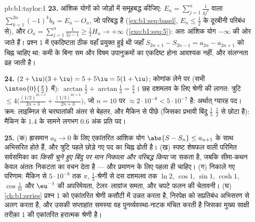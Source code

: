 \begin{solution}{pb:b1:taylor:1}
\textbf{23.} आंशिक योगों को जोड़ों में समूहबद्ध कीजिए: $E_n = \sum_{j=1}^{n}
\frac{1}{4j^2}$ वाला $\sum_{k=1}^{2n} (-1)^k b_k = E_n - O_n$, जो परिबद्ध है
(\cref{ex:b1:seq:basel}, $E_n \leq \frac12$ के दूरबीनी परिबंध से), और $O_n =
\sum_{j=1}^{n}\frac{1}{2j-1} \geq \frac12 H_n \to +\infty$
(\cref{exo:b1:seq:5}): अतः आंशिक योग $-\infty$ की ओर जाते हैं। प्रश्न 1 में
एकदिष्टता ठीक वहाँ प्रयुक्त हुई थी जहाँ $S_{2n+1} - S_{2n-1} = a_{2n} -
a_{2n+1}$ को चिह्न चाहिए था: कमी के बिना सम और विषम उपानुक्रमों का एकदिष्ट
होना आवश्यक नहीं, और संलग्नता ढह जाती है।

\textbf{24.} $(2+\iu)(3+\iu) = 5 + 5\iu = 5(1+\iu)$; कोणांक लेने पर (सभी
$\intoo{0}{\frac\pi2}$ में): $\arctan\frac12 + \arctan\frac13 = \frac\pi4$।
छह दशमलव के लिए श्रेणी की लागत: त्रुटि $\leq
4\bigl(\frac{(1/2)^{2n+3}}{2n+3} + \frac{(1/3)^{2n+3}}{2n+3}\bigr)$, जो $n =
10$ पर $\approx 2\cdot10^{-8} < 5\cdot10^{-7}$ है: अर्थात् ग्यारह पद। क्रम:
लाइब्निज़ से चरघातांकी अंतर से बेहतर, और मैकिन से पीछे (जिसका प्रभावी बिंदु
$\frac15$ $\frac12$ से छोटा है): मैकिन के $1.4$ के सामने लगभग $0.6$ अंक
प्रति पद।

\textbf{25.} (क) ह्रासमान $a_k \to 0$ के लिए एकांतरित आंशिक योग $\abs{S -
S_n} \leq a_{n+1}$ के साथ अभिसरित होते हैं, और त्रुटि पहले छोड़े गए पद का
चिह्न ढोती है। (ख) स्पष्ट शेषफल वाली परिमित सर्वसमिका का \emph{किसी चुने हुए
बिंदु पर मान निकाला और परिबद्ध किया} जा सकता है, जबकि सीमा-कथन केवल अंततः
निकटता का वचन देता है --- और प्रमाणन के लिए पहला ही चाहिए। (ग) निकाले गए
परिणाम: मैकिन से $5\cdot10^{-8}$ तक $\pi$, $\frac13$-श्रेणी से दस दशमलव तक
$\ln 2$, $\cos 1$, $\sin 1$, $\cosh 1$, $\cos\frac1m$ और $\eu^{-1}$ की
अपरिमेयता, टेलर--लाग्रांज समता, और चपटे फलन की चेतावनी। (घ)
\cref{ch:b1:series} प्रश्न 1 को एकांतरित श्रेणी कसौटी में उन्नत करता है,
निरपेक्ष को सप्रतिबंध अभिसरण से अलग करता है, और उसकी सप्ताहांत समस्या वह
पुनर्व्यवस्था-नाटक मंचित करती है जिसका मुख्य साक्षी तरीक़ा 1 की एकांतरित
हरात्मक श्रेणी है।
\end{solution}

